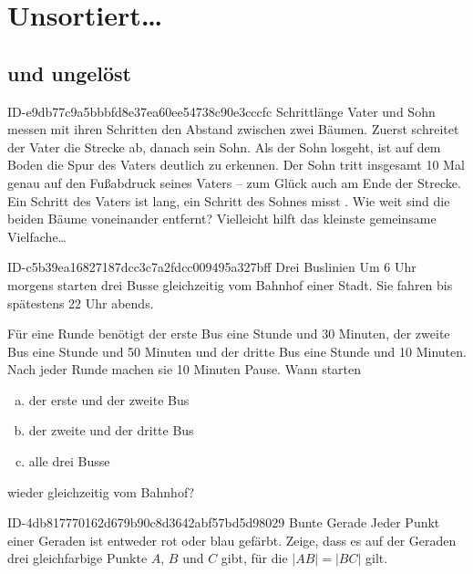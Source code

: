 \setcounter{chapter}{-1}
\chapter{Unsortiert\ldots}

\section{und ungelöst}

\begin{exercise}
      {ID-e9db77c9a5bbbfd8e37ea60ee54738c90e3cccfc}
      {Schrittlänge}
  \ifproblem\problem
    Vater und Sohn messen mit ihren Schritten den Abstand zwischen zwei Bäumen.
    Zuerst schreitet der Vater die Strecke ab, danach sein Sohn. Als der Sohn
    losgeht, ist auf dem Boden die Spur des Vaters deutlich zu erkennen.
    Der Sohn tritt insgesamt 10 Mal genau auf den Fußabdruck seines Vaters --
    zum Glück auch am Ende der Strecke. Ein Schritt des Vaters ist 
    lang, ein Schritt des Sohnes misst . Wie weit sind die beiden
    Bäume voneinander entfernt?
  \fi
  \ifoutline\outline
    Vielleicht hilft das kleinste gemeinsame Vielfache\ldots
  \fi
\end{exercise}

\begin{exercise}
      {ID-c5b39ea16827187dcc3c7a2fdcc009495a327bff}
      {Drei Buslinien}
  \ifproblem\problem
    Um 6 Uhr morgens starten drei Busse gleichzeitig vom Bahnhof einer Stadt.
    Sie fahren bis spätestens 22 Uhr abends.\par
    Für eine Runde benötigt
    der erste Bus eine Stunde und 30 Minuten,
    der zweite Bus eine Stunde und 50 Minuten und
    der dritte Bus eine Stunde und 10 Minuten.
    Nach jeder Runde machen sie 10 Minuten Pause.
    Wann starten
    \begin{enumerate}[a)]
      \item der erste und der zweite Bus
      \item der zweite und der dritte Bus
      \item alle drei Busse
    \end{enumerate}
    wieder gleichzeitig vom Bahnhof?
  \fi
\end{exercise}

\begin{exercise}
      {ID-4db817770162d679b90c8d3642abf57bd5d98029}
      {Bunte Gerade}
  \ifproblem\problem
    Jeder Punkt einer Geraden ist entweder rot oder blau gefärbt.
    Zeige, dass es auf der Geraden drei gleichfarbige Punkte $A$,
    $B$ und $C$ gibt, für die $|AB|=|BC|$ gilt.
  \fi
\end{exercise}


